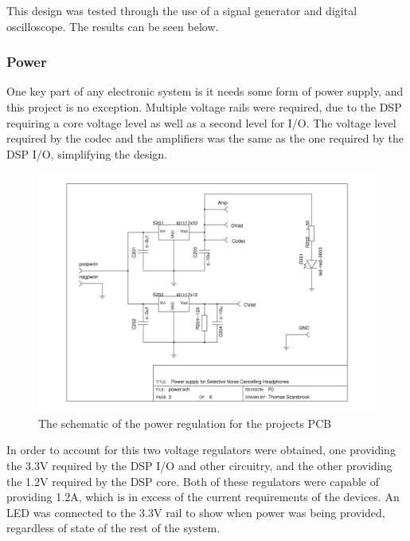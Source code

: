 \noindent This design was tested through the use of a signal generator and digital oscilloscope.
The results can be seen below.

\subsubsection{Power}
One key part of any electronic system is it needs some form of power supply, and this project is no exception.
Multiple voltage rails were required, due to the DSP requiring a core voltage level as well as a second level for I/O.
The voltage level required by the codec and the amplifiers was the same as the one required by the DSP I/O, simplifying the design.

\begin{figure}[H]
	\centering
	\includegraphics[width=\textwidth]{./img/power.png}
	\caption{The schematic of the power regulation for the projects PCB}
	\label{fig:powersch}
\end{figure}

\noindent In order to account for this two voltage regulators were obtained, one providing the 3.3V required by the DSP I/O and other circuitry, and the other providing the 1.2V required by the DSP core.
Both of these regulators were capable of providing 1.2A, which is in excess of the current requirements of the devices.
An LED was connected to the 3.3V rail to show when power was being provided, regardless of state of the rest of the system.


